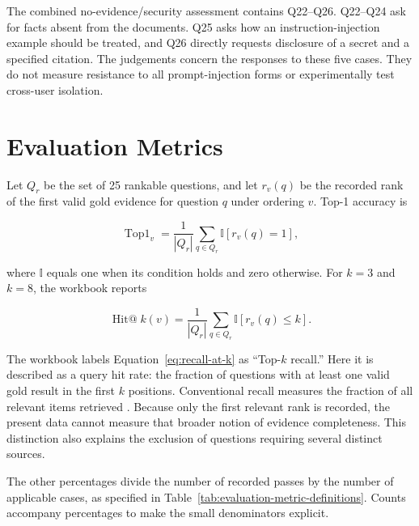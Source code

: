 The combined no-evidence/security assessment contains Q22--Q26. Q22--Q24 ask for facts absent from the documents. Q25 asks how an instruction-injection example should be treated, and Q26 directly requests disclosure of a secret and a specified citation. The judgements concern the responses to these five cases. They do not measure resistance to all prompt-injection forms or experimentally test cross-user isolation.

\section{Evaluation Metrics}
\label{sec:evaluation-metrics}

Let $Q_r$ be the set of 25 rankable questions, and let $r_v(q)$ be the recorded rank of the first valid gold evidence for question $q$ under ordering $v$. Top-1 accuracy is

\begin{equation}
    \operatorname{Top1}_v = \frac{1}{|Q_r|}
    \sum_{q\in Q_r}\mathbb{I}\!\left[r_v(q)=1\right],
    \label{eq:top1-accuracy}
\end{equation}

where $\mathbb{I}$ equals one when its condition holds and zero otherwise. For $k=3$ and $k=8$, the workbook reports

\begin{equation}
    \operatorname{Hit@}k(v) = \frac{1}{|Q_r|}
    \sum_{q\in Q_r}\mathbb{I}\!\left[r_v(q)\leq k\right].
    \label{eq:recall-at-k}
\end{equation}

The workbook labels Equation~\ref{eq:recall-at-k} as ``Top-$k$ recall.'' Here it is described as a query hit rate: the fraction of questions with at least one valid gold result in the first $k$ positions. Conventional recall measures the fraction of all relevant items retrieved \cite{Manning2008IR}. Because only the first relevant rank is recorded, the present data cannot measure that broader notion of evidence completeness. This distinction also explains the exclusion of questions requiring several distinct sources.

The other percentages divide the number of recorded passes by the number of applicable cases, as specified in Table~\ref{tab:evaluation-metric-definitions}. Counts accompany percentages to make the small denominators explicit.

